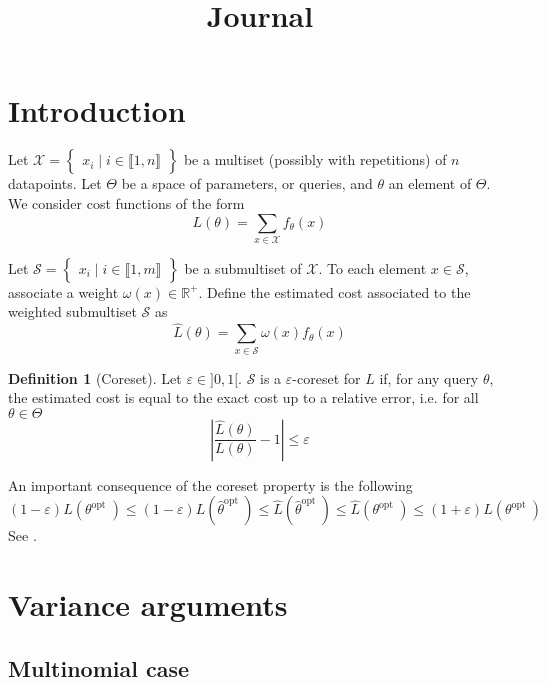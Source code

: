 \documentclass{article} %
\title{Journal}
\renewcommand{\epsilon}{\varepsilon}
\newcommand{\1}{\mathds{1}} %
\newcommand{\intint}[2]{\llbracket #1,#2 \rrbracket} %
\theoremstyle{definition} %
\newtheorem{definition}{Definition}[section]
\begin{document}
	
	\maketitle
	
	\section{Introduction}
	
	Let $\mathcal{X}=\begin{Bmatrix}
		x_{i} \mid i\in \intint{1}{n}
	\end{Bmatrix}$ be a multiset (possibly with repetitions) of $n$ datapoints. Let $\Theta$ be a space of parameters, or queries, and $\theta$ an element of $\Theta$. We consider cost functions of the form
	$$
	L(\theta)=\sum_{x \in \mathcal{X}} f_\theta(x)
	$$
	
	Let $\mathcal{S}=\begin{Bmatrix}
		x_{i} \mid i\in \intint{1}{m}
	\end{Bmatrix}$ be a submultiset of $\mathcal{X}$. To each element $x \in \mathcal{S}$, associate a weight $\omega\left(x\right) \in \mathbb{R}^{+}$. Define the estimated cost associated to the weighted submultiset $\mathcal{S}$ as
	$$
	\hat{L}(\theta)=\sum_{x \in \mathcal{S}} \omega\left(x\right) f_\theta(x)
	$$
	\begin{definition}[Coreset]
			Let $\epsilon \in {]}0,1{[}$. $\mathcal{S}$ is a $\epsilon$-coreset for $L$ if, for any query $\theta$, the estimated cost is equal to the exact cost up to a relative error, i.e. for all $\theta \in \Theta$
		\begin{equation}
			\left|\frac{\hat{L}(\theta)}{L(\theta)}-1\right| \le \epsilon 
		\label{def_coresetprop}
		\end{equation}
	\end{definition}
An important consequence of the coreset property is the following
\begin{equation}
	(1-\epsilon) L(\theta^{\text {opt }}) \le(1-\epsilon) L( \hat{\theta}^{\text {opt }}) \le \hat{L}( \hat{\theta}^{\text {opt }}) \le \hat{L}( \theta^{\text {opt }}) \le(1+\epsilon) L( \theta^{\text {opt }})
\end{equation}
See \cite{bachem2017coresetML}.

\section{Variance arguments}
\subsection{Multinomial case}
\end{document}
